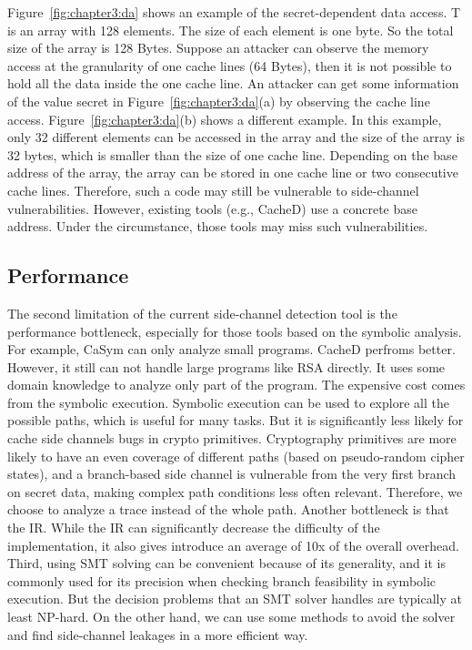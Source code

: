 Figure~\ref{fig:chapter3:da} shows an example of the secret-dependent data access. \textsf{T} is an array with 128 elements. The size of each element is one byte. So the total size of the array is 128 Bytes. Suppose an attacker can observe the memory access at the granularity of one cache lines (64 Bytes), then it is not possible to hold all the data inside the one cache line. An attacker can get some information of the value \textsf{secret} in Figure~\ref{fig:chapter3:da}(a) by observing the cache line access. Figure~\ref{fig:chapter3:da}(b) shows a different example. In this example, only 32 different elements can be accessed in the array and the size of the array is 32 bytes, which is smaller than the size of one cache line. Depending on the base address of the array, the array can be stored in one cache line or two consecutive cache lines. Therefore, such a code may still be vulnerable to side-channel vulnerabilities. However, existing tools (e.g., CacheD) use a concrete base address. Under the circumstance, those tools may miss such vulnerabilities. 

\subsection{Performance}
The second limitation of the current side-channel detection tool is the performance bottleneck, especially for those tools based on the symbolic analysis. For example, CaSym can only analyze small programs. CacheD perfroms better. However, it still can not handle large programs like RSA directly. It uses some domain knowledge to analyze only part of the program. The expensive cost comes from the symbolic execution. Symbolic execution can be used to explore all the possible paths, which is useful for many tasks. But it is significantly less likely for cache side channels bugs in crypto primitives. Cryptography primitives are more likely to have an even coverage of different paths (based on pseudo-random cipher states), and a branch-based side channel is vulnerable from the very first branch on secret data, making complex path conditions less often relevant. Therefore, we choose to analyze a trace instead of the whole path. Another bottleneck is that the IR. While the IR can significantly decrease the difficulty of the implementation, it also gives introduce an average of 10x of the overall overhead. Third, using SMT solving can be convenient because of its generality, and it is commonly used for its precision when checking branch feasibility in symbolic execution. But the decision problems that an SMT solver handles are typically at least NP-hard. On the other hand, we can use some methods to avoid the solver and find side-channel leakages in a more efficient way.

